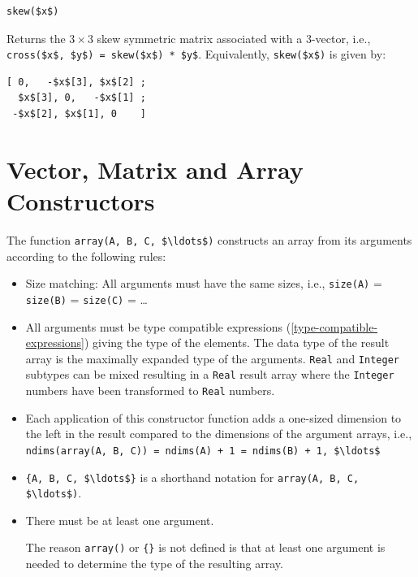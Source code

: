 \begin{functiondefinition}[skew]
\begin{synopsis}\begin{lstlisting}
skew($x$)
\end{lstlisting}\end{synopsis}
\begin{semantics}
Returns the $3 \times 3$ skew symmetric matrix associated with a 3-vector, i.e., \lstinline!cross($x$, $y$) = skew($x$) * $y$!.
Equivalently, \lstinline!skew($x$)! is given by:
\begin{lstlisting}[frame=none]
[ 0,   -$x$[3], $x$[2] ;
  $x$[3], 0,   -$x$[1] ;
 -$x$[2], $x$[1], 0    ]
\end{lstlisting}
\end{semantics}
\end{functiondefinition}

\section{Vector, Matrix and Array Constructors}\label{vector-matrix-and-array-constructors}

The  function \lstinline!array(A, B, C, $\ldots$)! constructs an array from its arguments according to the following rules:
\begin{itemize}
\item
  Size matching: All arguments must have the same sizes, i.e.,
  \lstinline!size(A)! = \lstinline!size(B)! = \lstinline!size(C)! = \ldots
\item
  All arguments must be type compatible expressions (\cref{type-compatible-expressions}) giving the type of the elements.
  The data type of the result array is the maximally expanded type of the arguments.
  \lstinline!Real! and \lstinline!Integer! subtypes can be mixed resulting in a \lstinline!Real! result array where the \lstinline!Integer! numbers have been transformed to \lstinline!Real! numbers.
\item
  Each application of this constructor function adds a one-sized dimension to the left in the result compared to the dimensions of the argument arrays, i.e., \lstinline!ndims(array(A, B, C)) = ndims(A) + 1 = ndims(B) + 1, $\ldots$!
\item
  \lstinline!{A, B, C, $\ldots$}! is a shorthand notation for \lstinline!array(A, B, C, $\ldots$)!.
\item
  There must be at least one argument.
  \begin{nonnormative}
  The reason \lstinline!array()! or \lstinline!{}! is not defined is that at least one argument is needed to determine the type of the resulting array.
  \end{nonnormative}
\end{itemize}

